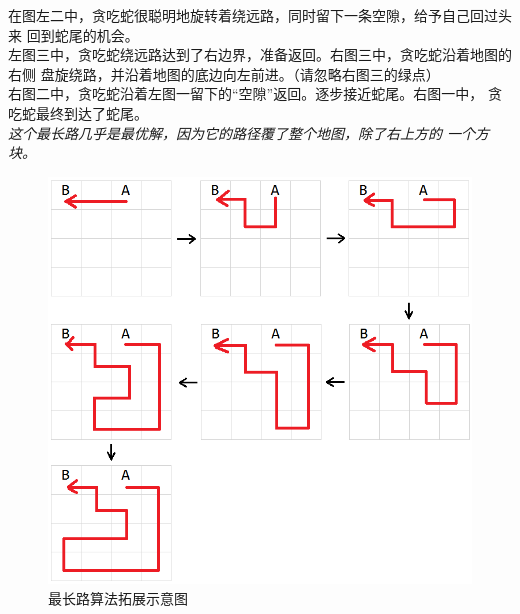 \documentclass[a4paper]{article}
\begin{document}
在图左二中，贪吃蛇很聪明地旋转着绕远路，同时留下一条空隙，给予自己回过头来
回到蛇尾的机会。\\

左图三中，贪吃蛇绕远路达到了右边界，准备返回。右图三中，贪吃蛇沿着地图的右侧
盘旋绕路，并沿着地图的底边向左前进。（请忽略右图三的绿点）\\

右图二中，贪吃蛇沿着左图一留下的``空隙''返回。逐步接近蛇尾。右图一中，
贪吃蛇最终到达了蛇尾。\\

\emph{这个最长路几乎是最优解，因为它的路径覆了整个地图，除了右上方的
一个方块。}
\begin{figure}[!hbt]
    \begin{center}
    \includegraphics[scale=0.4]{assets/build-longest.png}
    \caption{最长路算法拓展示意图\label{fig:build-longest}} 
    \end{center} 
\end{figure} 
\end{document}
